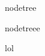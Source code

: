 \documentclass{article}
\begin{document}
\begin{NodetreeEmbedEnv}
nodetree

nodetreee
\end{NodetreeEmbedEnv}

lol
\end{document}
